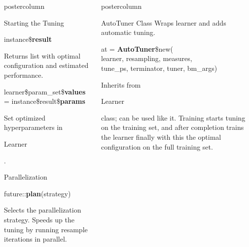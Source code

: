 \documentclass{beamer}
\newlength{\columnheight} %
\newcommand{\codeinline}[1]{\begin{codeboxinline}#1\end{codeboxinline}}
\begin{document}
\begin{frame}[fragile]{}
\begin{columns}
\begin{column}{.245\textwidth}
\begin{beamercolorbox}[center]{postercolumn}
\begin{minipage}{.98\textwidth}
{\begin{myblock}{Starting the Tuning}
							\vspace{1em}
							\begin{codebox}
								instance\$\textbf{result}
							\end{codebox}
							Returns list with optimal configuration and estimated performance.
							\\
							\begin{codebox}
								{\footnotesize learner\$param\_set\$\textbf{values} = instance\$result\$\textbf{params}}
							\end{codebox}
							Set optimized hyperparameters in \codeinline{Learner}.
						\end{myblock}
						\begin{myblock}{Parallelization}
							\begin{codebox}
								future::\textbf{plan}(strategy)
							\end{codebox}
							Selects the parallelization strategy.
							Speeds up the tuning by running resample iterations in parallel.
						\end{myblock}
						\vfill}
				\end{minipage}
			\end{beamercolorbox}
		\end{column}
		\begin{column}{.245\textwidth}
			\begin{beamercolorbox}[center]{postercolumn}
				\begin{minipage}{.98\textwidth}
					\parbox[t][\columnheight]{\textwidth}{
						\begin{myblock}{AutoTuner Class}
							Wraps learner and adds automatic tuning. 
							\\
							\begin{codeboxmultiline}[width=23.75cm]
								at = \textbf{AutoTuner}\$new(\\
								\hspace*{1ex}learner, resampling, measures, \\
								\hspace*{1ex}tune\_ps, terminator, tuner, bm\_args)
							\end{codeboxmultiline}
							\vspace{1em}
                            Inherits from \codeinline{Learner} class; can be used like it. 
                            Training starts tuning on the training set,
                            and after completion trains the learner finally with 
                            this the optimal configuration on the full training set.

\end{myblock}}
\end{minipage}
\end{beamercolorbox}
\end{column}
\end{columns}
\end{frame}
\end{document}
